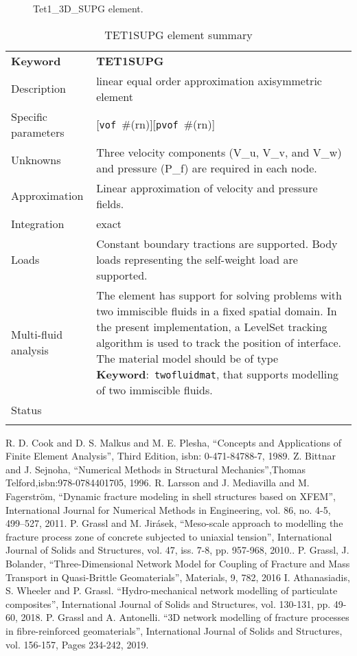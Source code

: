 \documentclass[a4paper]{article}
\newcommand{\descitem}[1]{{\noindent \textbf{#1}}:}
\newcommand{\elemkeyword}[1]{\descitem{Keyword}~\param{#1}} %
\newcommand{\param}[1]{\texttt{#1}} %
\newcommand{\optional}[1]{[#1]} %
\newcommand{\field}[2]{\param{#1}~\#{\tiny(#2)}} %
\newcommand{\optField}[2]{\optional{\field{#1}{#2}}}
\newcommand{\templabel}{}%
\newcommand{\tempcaption}{}%
\newcounter{nelpar}
\newenvironment{elementsummary}[5]{%
  \gdef\tempcaption{#4}%
  \gdef\templabel{#5}%
  \setcounter{nelpar}{0}%
  \begin{center} %
    \begin{table}[!htb] %
      \begin{tabular}{|l|p{9cm}|}\hline %
        {\bf Keyword} & \bf{#1}\\ %
        {Description} & {#2}\\ %
        {Specific parameters} & {#3}\\ \hline %
}{
  \\ \hline %
      \end{tabular}%
      \caption{\tempcaption}%
      \label{\templabel}%
    \end{table}%
  \end{center}%
}
\newcommand{\elementDescription}[2]{{#1} & {#2}\\ }
\begin{document}
\begin{figure}[htb]
 \centering
 \begin{makeimage}
  
 \end{makeimage}
 \caption{Tet1\_3D\_SUPG element.}
 \label{PY1_3D_SUPGfig}
\end{figure}

\begin{elementsummary}{TET1SUPG}{linear equal order approximation axisymmetric element}
  {\optField{vof}{rn}\optField{pvof}{rn}}{TET1SUPG element summary}{TET1SUPGsummary}
\elementDescription{Unknowns}{Three velocity components (V\_u, V\_v, and V\_w) and pressure (P\_f) are required in each node.}
\elementDescription{Approximation}{Linear approximation of velocity and pressure fields.}
\elementDescription{Integration}{exact}
\elementDescription{Loads}{Constant boundary tractions are supported. Body loads
representing the self-weight load are supported.}
\elementDescription{Multi-fluid analysis}{The element has support for solving
problems with two immiscible fluids in
a fixed spatial domain. In the present implementation, a LevelSet tracking algorithm
is used to track the position of interface. 
The material model should be of type \elemkeyword{twofluidmat}, that
supports modelling of two immiscible fluids.}
\elementDescription{Status}{}
\end{elementsummary}



\begin{thebibliography}{99}


 R. D. Cook and D. S. Malkus and M. E. Plesha, ``Concepts and Applications of Finite Element Analysis'', Third Edition, isbn: 0-471-84788-7, 1989.
 Z. Bittnar and J. Sejnoha, ``Numerical Methods in Structural Mechanics'',Thomas Telford,isbn:978-0784401705, 1996.
 R. Larsson and J. Mediavilla and M. Fagerström, ``Dynamic fracture modeling in shell structures based on XFEM'', International Journal for Numerical Methods in Engineering, vol. 86, no. 4-5, 499--527, 2011.
 P. Grassl and M. Jir\'{a}sek, ``Meso-scale approach to modelling the fracture process zone of concrete subjected to uniaxial tension'', International Journal of Solids and Structures, vol. 47, iss. 7-8, pp. 957-968, 2010..
 P. Grassl, J. Bolander, ``Three-Dimensional Network Model for Coupling of Fracture and Mass Transport in Quasi-Brittle Geomaterials'', Materials, 9, 782, 2016
 I. Athanasiadis, S. Wheeler and P. Grassl. ``Hydro-mechanical network modelling of particulate composites'', International Journal of Solids and Structures, vol. 130-131, pp. 49-60, 2018.
 P. Grassl and A. Antonelli. ``3D network modelling of fracture processes in fibre-reinforced geomaterials'', International Journal of Solids and Structures, vol. 156-157, Pages 234-242, 2019.

  
\end{thebibliography}
\end{document}
